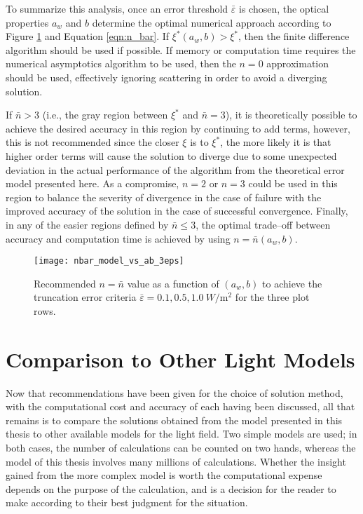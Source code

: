 To summarize this analysis, once an error threshold $\bar{\varepsilon}$ is chosen, the optical properties $a_w$ and $b$ determine the optimal numerical approach according to Figure \ref{fig:nbar_model_vs_ab_3eps} and Equation \eqref{eqn:n_bar}.
If $\xi^*(a_w, b) > \xi^*$, then the finite difference algorithm should be used if possible.
If memory or computation time requires the numerical asymptotics algorithm to be used, then the $n=0$ approximation should be used, effectively ignoring scattering in order to avoid a diverging solution.

If $\bar{n}>3$ (i.e., the gray region between $\xi^*$ and $\bar{n}=3$), it is theoretically possible to achieve the desired accuracy in this region by continuing to add terms, however, this is not recommended since the closer $\xi$ is to $\xi^*$, the more likely it is that higher order terms will cause the solution to diverge due to some unexpected deviation in the actual performance of the algorithm from the theoretical error model presented here.
As a compromise, $n=2$ or $n=3$ could be used in this region to balance the severity of divergence in the case of failure with the improved accuracy of the solution in the case of successful convergence.
Finally, in any of the easier regions defined by $\bar{n} \leq 3$, the optimal trade--off between accuracy and computation time is achieved by using $n=\bar{n}(a_w, b)$.

\begin{figure}[H]
  \centering
  \texttt{[image: nbar\_model\_vs\_ab\_3eps]}
  \caption{Recommended $n=\bar{n}$ value as a function of $(a_w,b)$ to achieve the truncation error criteria $\bar{\varepsilon}=0.1,0.5,1.0\SI{}{W\per\m\squared}$ for the three plot rows.}
  \label{fig:nbar_model_vs_ab_3eps}
\end{figure}


\section{Comparison to Other Light Models}

Now that recommendations have been given for the choice of solution method, with the computational cost and accuracy of each having been discussed, all that remains is to compare the solutions obtained from the model presented in this thesis to other available models for the light field.
Two simple models are used; in both cases, the number of calculations can be counted on two hands, whereas the model of this thesis involves many millions of calculations.
Whether the insight gained from the more complex model is worth the computational expense depends on the purpose of the calculation, and is a decision for the reader to make according to their best judgment for the situation.

